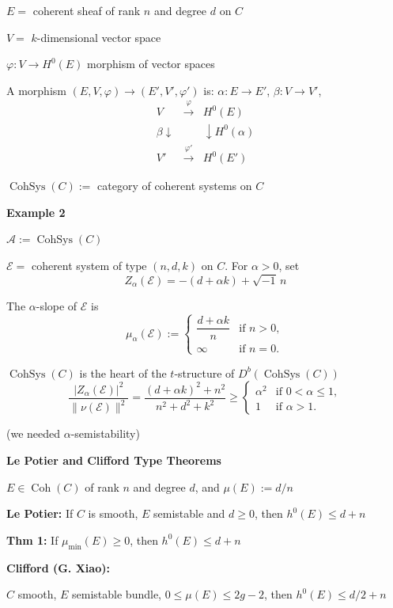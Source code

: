 $E=$ coherent sheaf of rank $n$ and degree
$d$ on $C$

$V=$ $k$-dimensional vector space

$\varphi:V\to H^0(E)$ morphism of vector
spaces

A morphism
$(E,V,\varphi)\to(E',V',\varphi')$ is:
$\alpha:E\to E'$, $\beta:V\to V'$,
$$
\begin{array}{ccc}
V&\xrightarrow{\ \varphi\ }&H^0(E)
\\
{\scriptstyle\beta}\downarrow
&&
\downarrow{\scriptstyle H^0(\alpha)}
\\
V'&\xrightarrow{\ \varphi'\ }&H^0(E')
\end{array}
$$

$\operatorname{CohSys}(C):=$ category of
coherent systems on $C$

\medskip\noindent
{\bf Example 2}

$\mathcal{A}:=\operatorname{CohSys}(C)$

$\mathcal{E}=$ coherent system of type
$(n,d,k)$ on $C$. For $\alpha>0$, set
$$
Z_\alpha(\mathcal{E})
=-(d+\alpha k)+\sqrt{-1}\,n
$$

The $\alpha$-slope of $\mathcal{E}$ is
$$
\mu_\alpha(\mathcal{E}):=
\begin{cases}
\dfrac{d+\alpha k}{n}
&\text{if }n>0,\\[6pt]
\infty
&\text{if }n=0.
\end{cases}
$$

$\operatorname{CohSys}(C)$ is the heart
of the $t$-structure of
$D^b(\operatorname{CohSys}(C))$
$$
\frac{|Z_\alpha(\mathcal{E})|^2}
{\|\nu(\mathcal{E})\|^2}
=
\frac{(d+\alpha k)^2+n^2}
{n^2+d^2+k^2}
\geq
\begin{cases}
\alpha^2&\text{if }0<\alpha\leq 1,\\
1&\text{if }\alpha>1.
\end{cases}
$$

(we needed $\alpha$-semistability)

\medskip\noindent
{\bf Le Potier and Clifford Type Theorems}

$E\in\operatorname{Coh}(C)$ of rank $n$
and degree $d$, and $\mu(E):=d/n$

\medskip\noindent
{\bf Le Potier:}
If $C$ is smooth, $E$ semistable and
$d\geq 0$, then
$h^0(E)\leq d+n$

\medskip\noindent
{\bf Thm 1:}
If $\mu_{\min}(E)\geq 0$, then
$h^0(E)\leq d+n$

\medskip\noindent
{\bf Clifford (G. Xiao):}

$C$ smooth, $E$ semistable bundle,
$0\leq\mu(E)\leq 2g-2$, then
$h^0(E)\leq d/2+n$

